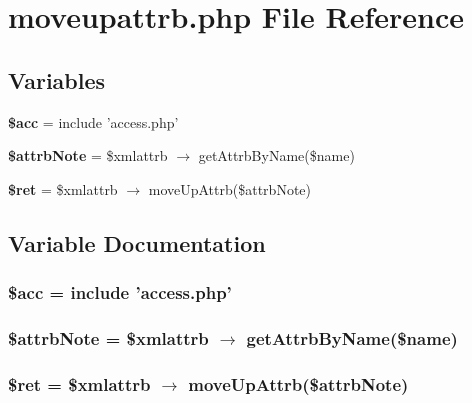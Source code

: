 \section{moveupattrb.php File Reference}
\label{moveupattrb_8php}


\subsection*{Variables}
\begin{CompactItemize}
\item 
{\bf \$acc} = include 'access.php'
\item 
{\bf \$attrb\-Note} = \$xmlattrb $\rightarrow$ get\-Attrb\-By\-Name(\$name)
\item 
{\bf \$ret} = \$xmlattrb $\rightarrow$ move\-Up\-Attrb(\$attrb\-Note)
\end{CompactItemize}


\subsection{Variable Documentation}
\subsubsection{\setlength{\rightskip}{0pt plus 5cm}\$acc = include 'access.php'}\label{moveupattrb_8php_542926c588a05eb69553d79c83cf73da}


\subsubsection{\setlength{\rightskip}{0pt plus 5cm}\$attrb\-Note = \$xmlattrb $\rightarrow$ get\-Attrb\-By\-Name(\$name)}\label{moveupattrb_8php_da7a2988da22b86a954a27a8d1f68a5f}


\subsubsection{\setlength{\rightskip}{0pt plus 5cm}\$ret = \$xmlattrb $\rightarrow$ move\-Up\-Attrb(\$attrb\-Note)}\label{moveupattrb_8php_ffd9e3eb0aad0a7ca42912cd925f148c}


